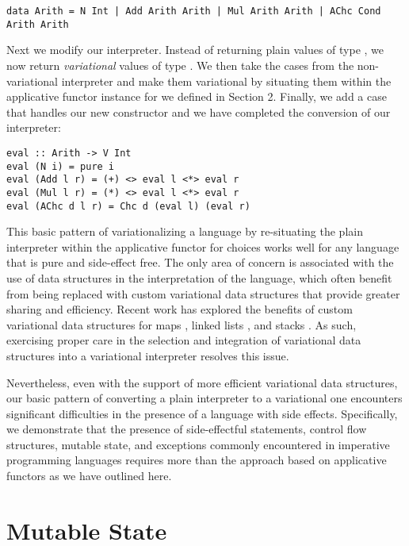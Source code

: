 \documentclass[onehalf,11pt]{beavtex}
\begin{document}
\begin{lstlisting}
data Arith = N Int | Add Arith Arith | Mul Arith Arith | AChc Cond Arith Arith
\end{lstlisting}

Next we modify our interpreter. Instead of returning plain values of type ,
we now return \emph{variational} values of type . We then take the cases
from the non-variational interpreter and make them variational by situating them within the
applicative functor instance for  we defined in Section 2. Finally, we add a case
that handles our new  constructor and we have completed the conversion of our
interpreter:

\begin{lstlisting}
eval :: Arith -> V Int
eval (N i) = pure i
eval (Add l r) = (+) <> eval l <*> eval r
eval (Mul l r) = (*) <> eval l <*> eval r
eval (AChc d l r) = Chc d (eval l) (eval r)
\end{lstlisting}

This basic pattern of variationalizing a language by re-situating the
plain interpreter within the applicative functor for choices works well for any language that is pure
and side-effect free. The only area of concern is associated with the use of data structures in the
interpretation of the language, which often benefit from being replaced with custom variational data structures that
provide greater sharing and efficiency. Recent work has explored the benefits of custom variational
data structures for maps \cite{walkingshaw2014variational}, linked lists \cite{lists}, and stacks \cite{stacks}.
As such, exercising proper care in the selection and integration of variational data structures
into a variational interpreter resolves this issue.

Nevertheless, even with the support of more efficient
variational data structures, our basic pattern of converting a plain interpreter to a variational one
encounters significant difficulties in the presence of a language with side effects. Specifically, we
demonstrate that the presence of side-effectful statements, control flow structures, mutable state, and exceptions
commonly encountered in imperative programming languages requires more than the approach based
on applicative functors as we have outlined here.

\section{Mutable State}
\end{document}
